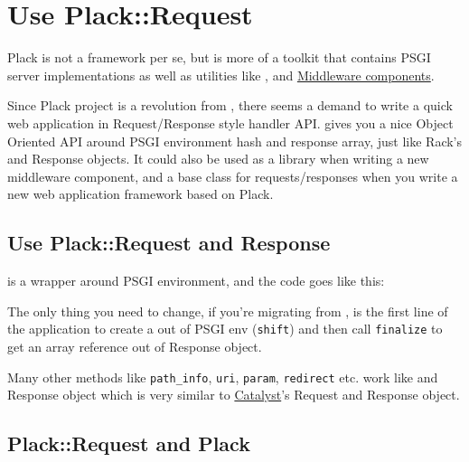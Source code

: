 \chapter{Use Plack::Request}\label{day-14-use-plackrequest}

Plack is not a framework per se, but is more of a toolkit that contains
PSGI server implementations as well as utilities like
\href{http://advent.plackperl.org/2009/12/day-3-using-plackup.html}{},
\href{http://advent.plackperl.org/2009/12/day-13-use-placktest-to-test-your-application.html}{}
and
\href{http://advent.plackperl.org/2009/12/day-10-using-plack-middleware.html}{Middleware
components}.

Since Plack project is a revolution from
\href{http://search.cpan.org/perldoc?HTTP::Engine}{}, there
seems a demand to write a quick web application in Request/Response
style handler API.  gives you a nice Object Oriented API
around PSGI environment hash and response array, just like Rack's
 and Response objects. It could also be used as a library
when writing a new middleware component, and a base class for
requests/responses when you write a new web application framework based
on Plack.

\section{Use Plack::Request and
Response}\label{use-plackrequest-and-response}

 is a wrapper around PSGI environment, and the code goes
like this:


The only thing you need to change, if you're migrating from
, is the first line of the application to create a
 out of PSGI env (\lstinline!shift!) and then call
\lstinline!finalize! to get an array reference out of Response object.

Many other methods like \lstinline!path_info!, \lstinline!uri!,
\lstinline!param!, \lstinline!redirect! etc. work like
 and Response object which is very similar to
\href{http://search.cpan.org/dist/Catalyst-Runtime}{Catalyst}'s Request
and Response object.

\section{Plack::Request and Plack}\label{plackrequest-and-plack}


